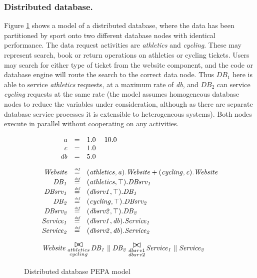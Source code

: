 \documentclass[runningheads]{llncs}
\begin{document}
%
%
\FloatBarrier
\subsubsection{Distributed database.} Figure \ref{figure:pepa_ddnr_model} shows a model of a distributed database, where the data has been partitioned by sport onto two different database nodes with identical performance.  The data request activities are {\itshape athletics} and {\itshape cycling}.  These may represent search, book or return operations on athletics or cycling tickets.  Users may search for either type of ticket from the website component, and the code or database engine will route the search to the correct data node.  Thus $\mathit{DB_1}$ here is able to service {\itshape athletics} requests, at a maximum rate of {\itshape db}, and $\mathit{DB_2}$ can service {\itshape cycling} requests at the same rate (the model assumes homogeneous database nodes to reduce the variables under consideration, although as there are separate database service processes it is extensible to heterogeneous systems).  Both nodes execute in parallel without cooperating on any activities.

\begin{figure}
	\centering
	\begin{displaymath}
	\begin{array}{rcl}
	\mathit{a} & = & 1.0-10.0\\
	\mathit{c} & = & 1.0\\
	\mathit{db} & = & 5.0\\
	[2.0ex]		\mathit{Website} & \rmdef & (\mathit{athletics},\mathit{a}).\mathit{Website}+(\mathit{cycling},\mathit{c}).\mathit{Website}\\
	\mathit{DB_1} & \rmdef & (\mathit{athletics},\top).\mathit{DBsrv_1}\\
	\mathit{DBsrv_1} & \rmdef & (\mathit{dbsrv1},\top).\mathit{DB_1}\\
	\mathit{DB_2} & \rmdef & (\mathit{cycling},\top).\mathit{DBsrv_2}\\
	\mathit{DBsrv_2} & \rmdef & (\mathit{dbsrv2},\top).\mathit{DB_2}\\
	\mathit{Service_1} & \rmdef & (\mathit{dbsrv1},\mathit{db}).\mathit{Service_1}\\
	\mathit{Service_2} & \rmdef & (\mathit{dbsrv2},\mathit{db}).\mathit{Service_2}\\
	[2.0ex]		\multicolumn{3}{l}{\mathit{Website}\sync{\substack{athletics\\cycling}}\mathit{DB_1}\parallel\mathit{DB_2}\sync{\substack{dbsrv1\\dbsrv2}}\mathit{Service_1}\parallel\mathit{Service_2}}\\
	[2.0ex]	\end{array}
	\end{displaymath}
	\caption{Distributed database PEPA model}
	\label{figure:pepa_ddnr_model}
\end{figure}
\end{document}
